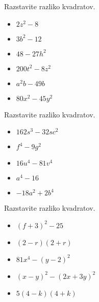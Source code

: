     
        
            \begin{naloga}
                Razstavite razliko kvadratov.
                \begin{itemize}
                    \item $2z^2-8$ 
                    \item $3b^2-12$ 
                    \item $48-27h^2$ 
                    \item $200t^2-8z^2$ 
                    \item $a^2b-49b$ 
                    \item $80x^2-45y^2$ 
                \end{itemize}
            \end{naloga}
        
    
        
            \begin{naloga}
                Razstavite razliko kvadratov.
                \begin{itemize}
                    \item $162s^3-32sc^2$ 
                    \item $f^4-9g^2$ 
                    \item $16u^4-81v^4$ 
                    \item $a^4-16$ 
                    \item $-18a^2+2b^4$ 
                \end{itemize}
            \end{naloga}
        
    
        
            \begin{naloga}
                Razstavite razliko kvadratov.
                \begin{itemize}
                    \item $(f+3)^2-25$ 
                    \item $(2-r)(2+r)$ 
                    \item $81x^4-(y-2)^2$ 
                    \item $(x-y)^2-(2x+3y)^2$ 
                    \item $5(4-k)(4+k)$ 
                \end{itemize}
            \end{naloga}
        
    
        
